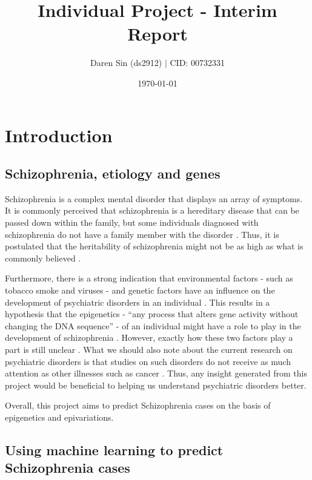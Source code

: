 \documentclass[12pt, twoside, a4paper]{article}
\begin{document}
\title{Individual Project - Interim Report}

\author{Daren Sin (ds2912) $|$ CID: 00732331}

\date{\today}
\maketitle

\section{Introduction}


\subsection{Schizophrenia, etiology and genes}

Schizophrenia is a complex mental disorder that displays an array of symptoms. It is commonly perceived that schizophrenia is a hereditary disease that can be passed down within the family, but some individuals diagnosed with schizophrenia do not have a family member with the disorder \cite{RefWorks:8}. Thus, it is postulated that the heritability of schizophrenia might not be as high as what is commonly believed \cite{RefWorks:9}.

Furthermore, there is a strong indication that environmental factors - such as tobacco smoke and viruses - and genetic factors have an influence on the development of psychiatric disorders in an individual \cite{RefWorks:8, RefWorks:10}. This results in a hypothesis that the epigenetics - ``any process that alters gene activity without changing the DNA sequence'' - of an individual might have a role to play in the development of schizophrenia \cite{RefWorks:12}. However, exactly how these two factors play a part is still unclear \cite{RefWorks:11}. What we should also note about the current research on psychiatric disorders is that studies on such disorders do not receive as much attention as other illnesses such as cancer \cite{RefWorks:82}. Thus, any insight generated from this project would be beneficial to helping us understand psychiatric disorders better.

Overall, this project aims to predict Schizophrenia cases on the basis of epigenetics and epivariations.


\subsection{Using machine learning to predict Schizophrenia cases} \label{intro_ML}
\end{document}
